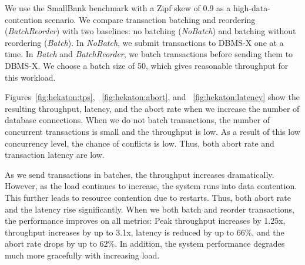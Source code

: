 
We use the SmallBank benchmark with a Zipf skew of 0.9 as a high-data-contention scenario. We compare transaction batching and reordering (\emph{BatchReorder}) with two baselines: no batching (\emph{NoBatch}) and batching without reordering (\emph{Batch}). In \emph{NoBatch}, we submit transactions to DBMS-X one at a time. In \emph{Batch} and \emph{BatchReorder}, we batch transactions before sending them to DBMS-X. We choose a batch size of 50, which gives reasonable throughput for this workload.

Figures~\ref{fig:hekaton:tps}, ~\ref{fig:hekaton:abort}, and ~\ref{fig:hekaton:latency} show the resulting throughput, latency, and the abort rate when we increase the number of database connections.  When we do not batch transactions, the number of concurrent transactions is small and the throughput is low. As a result of this low concurrency level, the chance of conflicts is low. Thus, both abort rate and transaction latency are low. 

As we send transactions in batches, the throughput increases dramatically. 
However, as the load continues to increase, the system runs into data contention. This further leads to resource contention due to restarts. Thus, both abort rate and the latency rise significantly. When we both batch and reorder transactions, the performance improves on all metrics: Peak throughput increases by 1.25x, throughput increases by up to 3.1x, latency is reduced by up to 66\%, and the abort rate drops by up to 62\%. In addition, the system performance degrades much more gracefully with increasing load.
